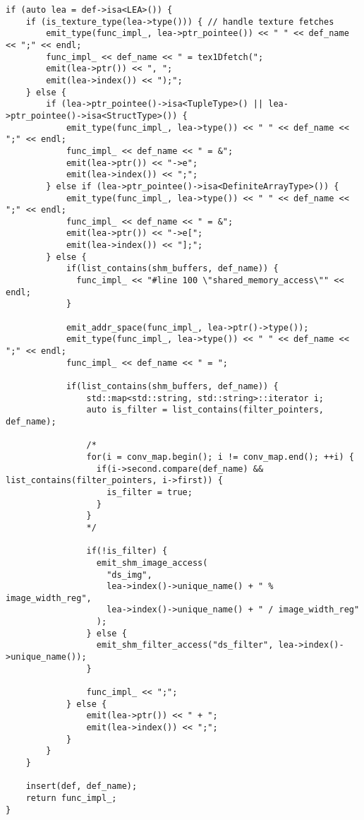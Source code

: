 \documentclass{article}
\begin{document}
\begin{verbatim}
if (auto lea = def->isa<LEA>()) {
    if (is_texture_type(lea->type())) { // handle texture fetches
        emit_type(func_impl_, lea->ptr_pointee()) << " " << def_name << ";" << endl;
        func_impl_ << def_name << " = tex1Dfetch(";
        emit(lea->ptr()) << ", ";
        emit(lea->index()) << ");";
    } else {
        if (lea->ptr_pointee()->isa<TupleType>() || lea->ptr_pointee()->isa<StructType>()) {
            emit_type(func_impl_, lea->type()) << " " << def_name << ";" << endl;
            func_impl_ << def_name << " = &";
            emit(lea->ptr()) << "->e";
            emit(lea->index()) << ";"; 
        } else if (lea->ptr_pointee()->isa<DefiniteArrayType>()) {
            emit_type(func_impl_, lea->type()) << " " << def_name << ";" << endl;
            func_impl_ << def_name << " = &";
            emit(lea->ptr()) << "->e[";
            emit(lea->index()) << "];";
        } else {
            if(list_contains(shm_buffers, def_name)) {
              func_impl_ << "#line 100 \"shared_memory_access\"" << endl;
            }

            emit_addr_space(func_impl_, lea->ptr()->type());
            emit_type(func_impl_, lea->type()) << " " << def_name << ";" << endl;
            func_impl_ << def_name << " = ";

            if(list_contains(shm_buffers, def_name)) {
                std::map<std::string, std::string>::iterator i;
                auto is_filter = list_contains(filter_pointers, def_name);

                /*
                for(i = conv_map.begin(); i != conv_map.end(); ++i) {
                  if(i->second.compare(def_name) && list_contains(filter_pointers, i->first)) {
                    is_filter = true;
                  }
                }
                */

                if(!is_filter) {
                  emit_shm_image_access(
                    "ds_img",
                    lea->index()->unique_name() + " % image_width_reg",
                    lea->index()->unique_name() + " / image_width_reg"
                  );
                } else {
                  emit_shm_filter_access("ds_filter", lea->index()->unique_name());
                }

                func_impl_ << ";"; 
            } else { 
                emit(lea->ptr()) << " + ";
                emit(lea->index()) << ";"; 
            }
        }
    }

    insert(def, def_name);
    return func_impl_;
}
\end{verbatim}
\end{document}
